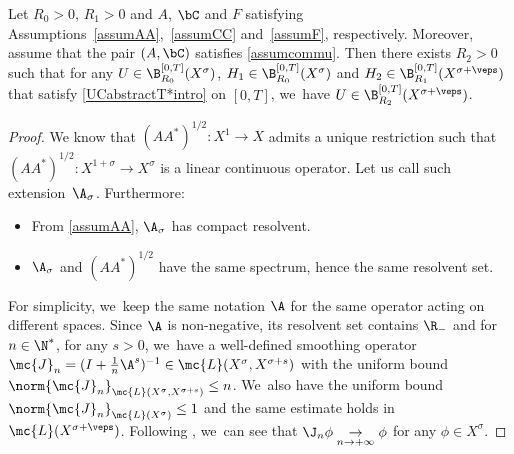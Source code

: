 \begin{proposition}\label{prop:abs-prop-reg}
Let $R_{0}>0$, $R_{1}>0$ and $A$, $\bC$ and $F$ satisfying Assumptions~\ref{assumAA},~\ref{assumCC} and~\ref{assumF}, respectively. Moreover, assume that the pair $(A, \bC)$ satisfies \cref{assumcommu}. Then there exists $R_{2}>0$ such that for any
$U\in \B_{R_{0}}^{[0,T]}(X^{\sigma})$, $H_{1}\in \B_{R_{0}}^{[0,T]}(X^{\sigma})$ and $H_{2}\in \B_{R_{1}}^{[0,T]}(X^{\sigma+\veps})$ that satisfy \eqref{UCabstractT*intro} on $[0,T]$, we~have $U\in \B_{R_{2}}^{[0,T]}(X^{\sigma+\veps})$.
\end{proposition}
\begin{proof}

We know that $(AA^*)^{1/2}: X^1\to X$ admits a unique restriction such that $(AA^*)^{1/2}: X^{1+\sigma}\to X^{\sigma}$ is a linear continuous operator. Let us call such extension~$\A_\sigma$. Furthermore:
\begin{itemize}
\item From \cref{assumAA}, $\A_\sigma$ has compact resolvent.
\item $\A_\sigma$ and $(AA^*)^{1/2}$ have the same spectrum, hence the same resolvent set.
\end{itemize}
For simplicity, we~keep the same notation $\A$ for the same operator acting on different spaces. Since $\A$ is non-negative, its resolvent set contains $\R_-$ and for $n\in \N^*$, for any $s>0$, we~have a well-defined smoothing operator $\mc{J}_n=(I+\frac{1}{n}\A^s)^{-1}\in \mc{L}(X^\sigma, X^{\sigma+s})$ with the uniform bound $\norm{\mc{J}_n}_{\mc{L}(X^\sigma, X^{\sigma+s})}\leq n$. We~also have the uniform bound $\norm{\mc{J}_n}_{\mc{L}(X^\sigma)}\leq 1$ and the same estimate holds in $\mc{L}(X^{\sigma+\veps})$. Following \cite[Prop.\,2.3.4]{TW:09}, we~can see that $\J_n \phi\underset{n\to+\infty}{\to} \phi$ for any $\phi\in X^\sigma$.


\end{proof}
